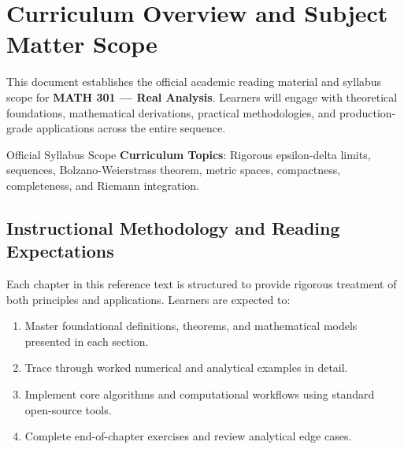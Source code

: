 \section{Curriculum Overview and Subject Matter Scope}

This document establishes the official academic reading material and syllabus scope for \textbf{MATH 301 --- Real Analysis}. Learners will engage with theoretical foundations, mathematical derivations, practical methodologies, and production-grade applications across the entire sequence.

\begin{InsightBox}{Official Syllabus Scope}
  \textbf{Curriculum Topics}: Rigorous epsilon-delta limits, sequences, Bolzano-Weierstrass theorem, metric spaces, compactness, completeness, and Riemann integration.
\end{InsightBox}

\subsection{Instructional Methodology and Reading Expectations}

Each chapter in this reference text is structured to provide rigorous treatment of both principles and applications. Learners are expected to:
\begin{enumerate}
  \item Master foundational definitions, theorems, and mathematical models presented in each section.
  \item Trace through worked numerical and analytical examples in detail.
  \item Implement core algorithms and computational workflows using standard open-source tools.
  \item Complete end-of-chapter exercises and review analytical edge cases.
\end{enumerate}

